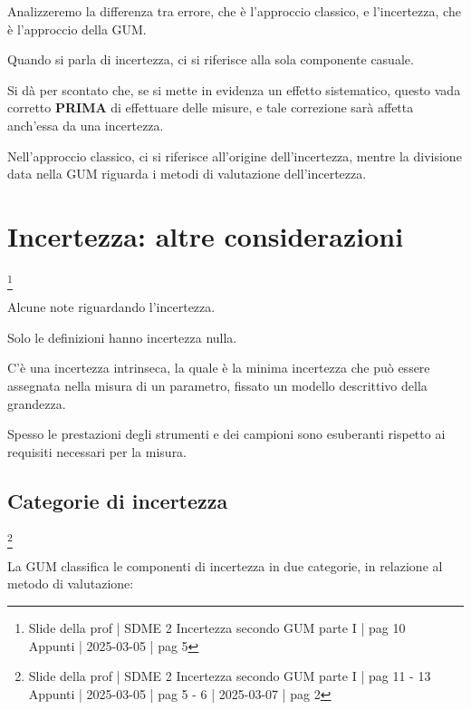 Analizzeremo la differenza tra errore, che è l'approccio classico, e l'incertezza, che è l'approccio della GUM. \newline 

Quando si parla di incertezza, ci si riferisce alla sola componente casuale. \newline 

Si dà per scontato che, se si mette in evidenza un effetto sistematico, 
questo vada corretto \textbf{PRIMA} di effettuare delle misure, e tale correzione sarà affetta anch'essa da una incertezza. \newline 

Nell'approccio classico, ci si riferisce all'origine dell'incertezza, 
mentre la divisione data nella GUM riguarda i metodi di valutazione dell'incertezza. \newline 

\newpage 

\section{Incertezza: altre considerazioni}
\footnote{Slide della prof | SDME 2 Incertezza secondo GUM parte I | pag 10 \\  
Appunti | 2025-03-05 | pag 5}

Alcune note riguardando l'incertezza. \newline 

Solo le definizioni hanno incertezza nulla. \newline 

C'è una incertezza intrinseca, la quale è la minima incertezza che può essere assegnata nella misura di un parametro, 
fissato un modello descrittivo della grandezza. \newline 

Spesso le prestazioni degli strumenti e dei campioni sono esuberanti rispetto ai requisiti necessari per la misura. \newline 

\newpage 

\subsection{Categorie di incertezza}
\footnote{Slide della prof | SDME 2 Incertezza secondo GUM parte I | pag 11 - 13 \\  
Appunti | 2025-03-05 | pag 5 - 6 | 2025-03-07 | pag 2}

La GUM classifica le componenti di incertezza in due categorie, 
in relazione al metodo di valutazione: 

